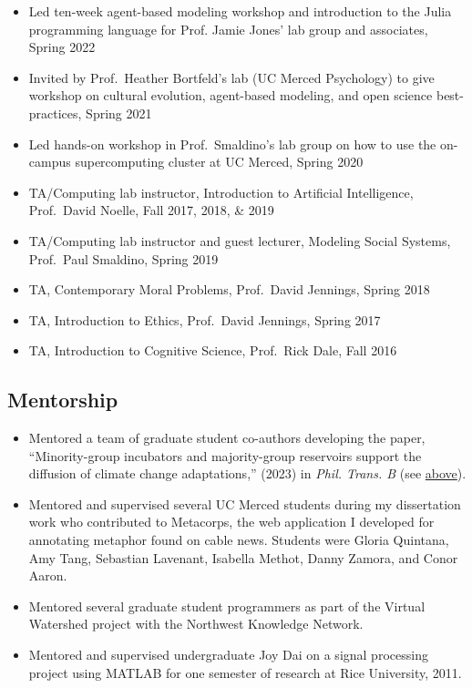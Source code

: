 \documentclass[11pt, letterpaper]{article}
\begin{document}
\begin{itemize}
  \item
   Led ten-week agent-based modeling workshop and introduction to the Julia
    programming language for Prof. Jamie Jones' lab group and associates,
    Spring 2022

  \item
   Invited by Prof.\ Heather Bortfeld's lab (UC Merced Psychology) to give workshop on cultural evolution, agent-based modeling, and open science best-practices, Spring 2021

 \item
   Led hands-on workshop in Prof.\ Smaldino's lab group on how to use the on-campus supercomputing cluster at UC Merced, Spring 2020

 \item
   TA/Computing lab instructor, Introduction to Artificial Intelligence, Prof.\ David Noelle, Fall 2017, 2018, \& 2019

 \item
   TA/Computing lab instructor and guest lecturer, Modeling Social Systems, Prof.\ Paul Smaldino, Spring 2019
 \item
   TA, Contemporary Moral Problems, Prof.\ David Jennings, Spring 2018
 \item
   TA, Introduction to Ethics, Prof.\ David Jennings, Spring 2017
 \item
   TA, Introduction to Cognitive Science, Prof.\ Rick Dale, Fall 2016

\end{itemize}

\vspace{-1em}
 \subsection*{Mentorship}

\begin{itemize}
  \item Mentored a team of graduate student co-authors developing the paper,
    ``Minority-group incubators and majority-group reservoirs support the diffusion
    of climate change adaptations,'' (2023) in \emph{Phil. Trans. B} (see \hyperlink{ptblink}{above}).
  \item Mentored and supervised several UC Merced students during my dissertation work
    who contributed to
    Metacorps, the web application I developed for annotating metaphor found
    on cable news. Students were Gloria Quintana, Amy Tang, Sebastian Lavenant, Isabella Methot,
    Danny Zamora, and Conor Aaron.
  \item
    Mentored several graduate student programmers as part of the Virtual Watershed
    project with the Northwest Knowledge Network.
  \item Mentored and supervised undergraduate Joy Dai on a signal processing project using MATLAB for
    one semester of research at Rice University, 2011.
\end{itemize}
\end{document}
